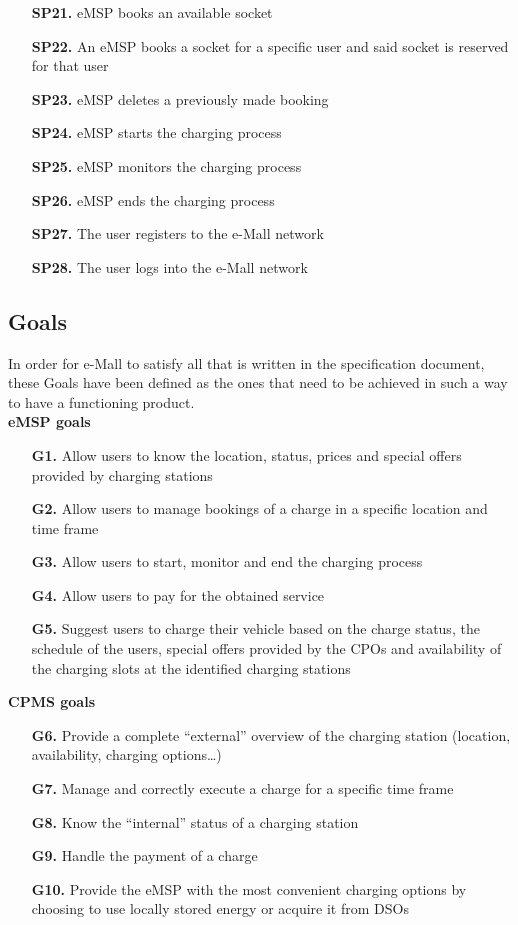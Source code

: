 \documentclass[12pt]{report}
\begin{document}
\begin{itemize}
    \item[\textbf{SP21.}]eMSP books an available socket
    \item[\textbf{SP22.}]An eMSP books a socket for a specific user and said socket is reserved for that user
    \item[\textbf{SP23.}]eMSP deletes a previously made booking
    \item[\textbf{SP24.}]eMSP starts the charging process
    \item[\textbf{SP25.}]eMSP monitors the charging process
    \item[\textbf{SP26.}]eMSP ends the charging process
    \item[\textbf{SP27.}]The user registers to the e-Mall network
    \item[\textbf{SP28.}]The user logs into the e-Mall network
\end{itemize}

\bigskip

\subsection{Goals}
In order for e-Mall to satisfy all that is written in the specification document, these Goals have been defined as the ones that need to be achieved in such a way to have a functioning product.\\
\textbf{eMSP goals}
\begin{itemize}
    \item[\textbf{G1.}]   Allow users to know the location, status, prices and special offers provided by charging stations
    \item[\textbf{G2.}]  Allow users to manage bookings of  a charge in a specific location and time frame
    \item[\textbf{G3.}] Allow users to start, monitor and end the charging process
    \item[\textbf{G4.}] Allow users to pay for the obtained service
    \item[\textbf{G5.}] Suggest users to charge their vehicle based on the charge status, the schedule of the users, special offers provided by the CPOs and availability of the charging slots at the identified charging stations\\
\end{itemize}
\textbf{CPMS goals}
\begin{itemize}
    \item[\textbf{G6.}] Provide a complete “external” overview of the charging station (location, availability, charging options…)
    \item[\textbf{G7.}] Manage and correctly execute a charge for a specific time frame
    \item[\textbf{G8.}] Know the “internal” status of a charging station
    \item[\textbf{G9.}] Handle the payment of a charge
    \item[\textbf{G10.}] Provide the eMSP with the most convenient charging options by choosing to use locally stored energy or acquire it from DSOs
\end{itemize}
\end{document}
